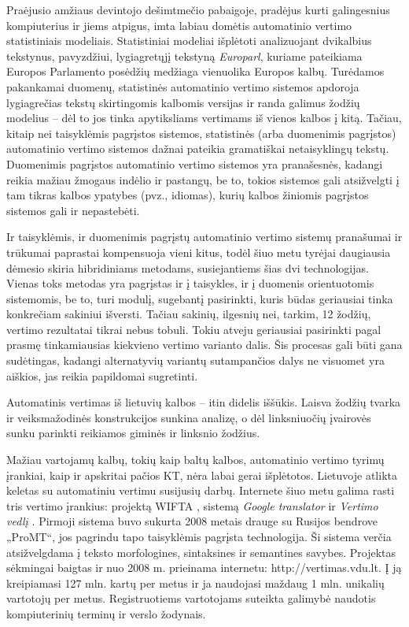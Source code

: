 \begin{multicols}{2}
 Praėjusio amžiaus devintojo dešimtmečio pabaigoje, pradėjus kurti galingesnius kompiuterius ir jiems atpigus, imta labiau domėtis automatinio vertimo statistiniais modeliais. Statistiniai modeliai išplėtoti analizuojant dvikalbius tekstynus, pavyzdžiui, lygiagretųjį tekstyną \textit{Europarl}, kuriame pateikiama Europos Parlamento posėdžių medžiaga vienuolika Europos kalbų. Turėdamos pakankamai duomenų, statistinės automatinio vertimo sistemos apdoroja lygiagrečias tekstų skirtingomis kalbomis versijas ir randa galimus žodžių modelius – dėl to jos tinka apytiksliams vertimams iš vienos kalbos į kitą. Tačiau, kitaip nei taisyklėmis pagrįstos sistemos, statistinės (arba duomenimis pagrįstos) automatinio vertimo sistemos dažnai pateikia gramatiškai netaisyklingų tekstų. Duomenimis pagrįstos automatinio vertimo sistemos yra pranašesnės, kadangi reikia mažiau žmogaus indėlio ir pastangų, be to, tokios sistemos gali atsižvelgti į tam tikras kalbos ypatybes (pvz., idiomas), kurių kalbos žiniomis pagrįstos sistemos gali ir nepastebėti.    

Ir taisyklėmis, ir duomenimis pagrįstų automatinio vertimo sistemų pranašumai ir trūkumai paprastai kompensuoja vieni kitus, todėl šiuo metu tyrėjai daugiausia dėmesio skiria hibridiniams metodams, susiejantiems šias dvi technologijas. Vienas toks metodas yra pagrįstas ir į taisykles, ir į duomenis orientuotomis sistemomis, be to, turi modulį, sugebantį pasirinkti, kuris būdas geriausiai tinka konkrečiam sakiniui išversti. Tačiau sakinių, ilgesnių nei, tarkim, 12 žodžių, vertimo rezultatai tikrai nebus tobuli. Tokiu atveju geriausiai pasirinkti pagal prasmę tinkamiausias kiekvieno vertimo varianto dalis. Šis procesas gali būti gana sudėtingas, kadangi alternatyvių variantų sutampančios dalys ne visuomet yra aiškios, jas reikia papildomai sugretinti. 


Automatinis vertimas iš lietuvių kalbos – itin didelis iššūkis. Laisva žodžių tvarka ir veiksmažodinės konstrukcijos sunkina analizę, o dėl linksniuočių įvairovės sunku parinkti reikiamos giminės ir linksnio žodžius.   

    Mažiau vartojamų kalbų, tokių kaip baltų kalbos, automatinio vertimo tyrimų įrankiai, kaip ir apskritai pačios KT, nėra labai gerai išplėtotos. Lietuvoje atlikta keletas su automatiniu vertimu susijusių darbų. Internete šiuo metu galima rasti tris vertimo įrankius: projektą WIFTA \cite{vertvdu},  sistemą \textit{Google translator} ir \textit{Vertimo vedlį} \cite{mvlab}. Pirmoji sistema buvo sukurta 2008 metais drauge su Rusijos bendrove „ProMT“, jos pagrindu tapo taisyklėmis pagrįsta technologija. Ši sistema verčia atsižvelgdama į teksto morfologines, sintaksines ir semantines savybes. Projektas sėkmingai baigtas ir nuo 2008 m. prieinama internetu: http://vertimas.vdu.lt. Į ją kreipiamasi 127 mln. kartų per metus ir ja naudojasi maždaug 1 mln. unikalių vartotojų per metus. Registruotiems vartotojams suteikta galimybė naudotis kompiuterinių terminų ir verslo žodynais.


\end{multicols}
